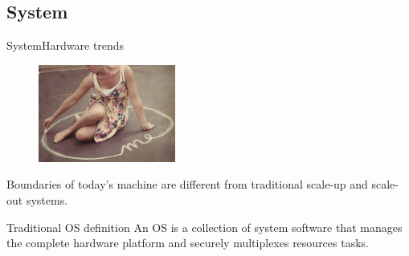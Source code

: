 \documentclass[10pt]{beamer}
\begin{document}
\subsection{System}
\begin{frame}{System}{Hardware trends}
  \begin{figure}[ht]
    \includegraphics[width=0.4\textwidth, keepaspectratio=true]{images/boundary.jpg}
  \end{figure} \pause

  \begin{block}{}
    Boundaries of today's machine are different from traditional scale-up and
    scale-out systems.
   \end{block}

   \begin{block}{Traditional OS definition}
      An OS is a collection of system software that manages the complete
      hardware platform and securely multiplexes resources tasks.
   \end{block}
\end{frame}

\end{document}
